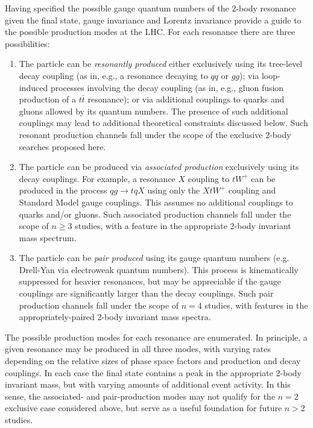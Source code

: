 Having specified the possible gauge quantum numbers of the 2-body resonance given the final state, gauge invariance and Lorentz invariance provide a guide to the possible production modes at the LHC. For each resonance there are three possibilities:

\begin{enumerate}
\item The particle can be {\it resonantly produced} either exclusively using its tree-level decay coupling (as in, e.g., a resonance decaying to $qq$ or $gg$); via loop-induced processes involving the decay coupling (as in, e.g., gluon fusion production of a $t \bar t$ resonance); or via additional couplings to quarks and gluons allowed by its quantum numbers. The presence of such additional couplings may lead to additional theoretical constraints discussed below. Such resonant production channels fall under the scope of the exclusive 2-body searches proposed here.
\item The particle can be produced via {\it associated production} exclusively using its decay couplings. For example, a resonance $X$ coupling to $tW^+$ can be produced in the process $q g \to t q X$ using only the $X t W^+$ coupling and Standard Model gauge couplings. This assumes no additional couplings to quarks and/or gluons. Such associated production channels fall under the scope of $n \geq 3$  studies, with a feature in the appropriate 2-body invariant mass spectrum.
\item The particle can be {\it pair produced} using its gauge quantum numbers (e.g. Drell-Yan via  electroweak quantum numbers). This process is kinematically suppressed for heavier resonances, but may be appreciable if the gauge couplings are significantly larger than the decay couplings. Such pair production channels fall under the scope of $n=4$ studies, with features in the appropriately-paired 2-body invariant mass spectra.
\end{enumerate}

The possible production modes for each resonance are enumerated. In principle, a given resonance may be produced in all three modes, with varying rates depending on the relative sizes of phase space factors and production and decay couplings. In each case the final state contains a peak in the appropriate 2-body invariant mass, but with varying amounts of additional event activity. In this sense, the associated- and pair-production modes may not qualify for the $n=2$ exclusive case considered above, but serve as a useful foundation for future $n>2$ studies.

